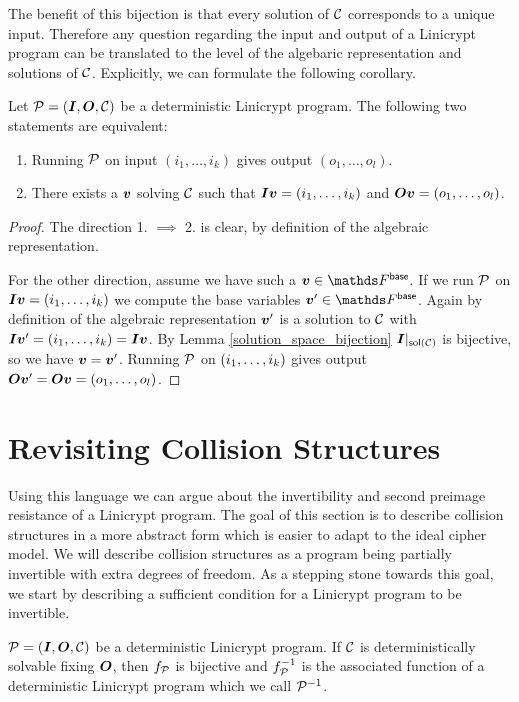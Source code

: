 The benefit of this bijection is that every solution of $\C$ corresponds to a unique input.
Therefore any question regarding the input and output of a Linicrypt program can be translated to the level of the algebaric representation and solutions of $\C$.
Explicitly, we can formulate the following corollary.

\begin{corollary}
\label{det_solvable_equiv}
    Let $\P = (\I, \O, \C)$ be a deterministic Linicrypt program.
    The following two statements are equivalent:
    \begin{enumerate}
    \item
        Running $\P$ on input $(i_1, \dots, i_k)$ gives output $(o_1, \dots, o_l)$.
    \item 
        There exists a $\vv$ solving $\C$ such that
        $\I\vv = (\dts i k)$ and
        $\O\vv = (\dts o l)$.
    \end{enumerate}
\end{corollary}

\begin{proof}
    The direction 1. $\implies$ 2. is clear, by definition of the algebraic representation.
    
    For the other direction, assume we have such a $\vv \in \Base$.
    If we run $\P$ on $\I\vv = (\dts i k)$ we compute the base variables $\vv' \in \Base$.
    Again by definition of the algebraic representation $\vv'$ is a solution to $\C$ with $\I\vv' = (\dts i k) = \I\vv$.
    By Lemma \ref{solution_space_bijection} $\I|_{\sol(\C)}$ is bijective,
    so we have $\vv = \vv'$.
    Running $\P$ on $(\dts i k)$ gives output $\O\vv' = \O\vv = (\dts o l)$.
\end{proof}


\section{Revisiting Collision Structures}

Using this language we can argue about the invertibility and second preimage resistance of a Linicrypt program.
The goal of this section is to describe collision structures in a more abstract form 
which is easier to adapt to the ideal cipher model.
We will describe collision structures as a program being partially invertible with extra degrees of freedom.
As a stepping stone towards this goal, we start by describing a sufficient condition for a Linicrypt program to be invertible.

\begin{lemma}
\label{inversion}
    $\P = (\I, \O, \C)$ be a deterministic Linicrypt program.
    If $\C$ is deterministically solvable fixing $\O$,
    then $f_\P$ is bijective and $f_\P^{-1}$ is the associated function of a deterministic Linicrypt program which we call $\P^{-1}$.
\end{lemma}

